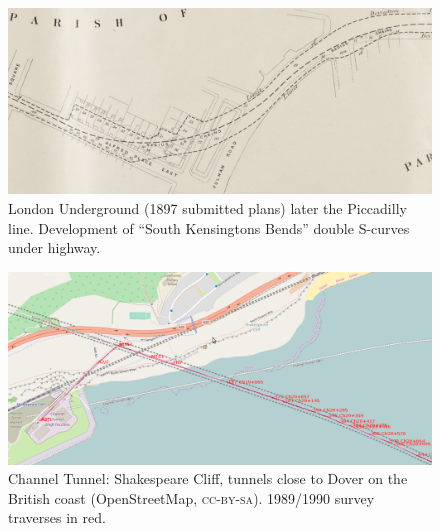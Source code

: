 \documentclass[conference,a4paper]{IEEEtran}
\begin{document}
\begin{figure}[!lt]
  \centering
  \includegraphics[width=15.1cm]{reverse-curves-cropped}
  \vspace{-0.5em}
  \caption{London Underground (1897 submitted plans) later the Piccadilly line.  Development of ``South Kensingtons Bends'' double S-curves under highway.\hfill}
  \label{fig:south-ken-bends}
\end{figure}
\vspace{-1em}
\begin{figure}[!lt]
  \centering
  \includegraphics[width=15.1cm]{shakespeare-cliff-cropped}
  \vspace{-0.5em}
  \caption{Channel Tunnel: Shakespeare Cliff, tunnels close to Dover on the British coast (OpenStreetMap, \textsc{cc-by-sa}). 1989/1990 survey traverses in red.}
  \label{fig:osm-chunnel-traverse}
\end{figure}




\end{document}
